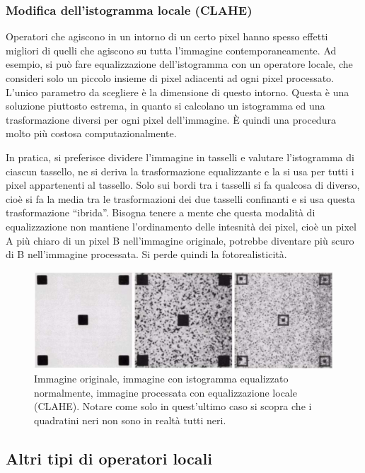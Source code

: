 \documentclass[a4paper,11pt]{article}
\begin{document}
\subsubsection{Modifica dell'istogramma locale (CLAHE)}
Operatori che agiscono in un intorno di un certo pixel hanno spesso effetti migliori di quelli che agiscono su tutta l'immagine contemporaneamente.
Ad esempio, si può fare equalizzazione dell'istogramma con un operatore locale, che consideri solo un piccolo insieme di pixel adiacenti
ad ogni pixel processato. L'unico parametro da scegliere è la dimensione di questo intorno. Questa è una soluzione piuttosto estrema, in quanto si calcolano un istogramma
ed una trasformazione diversi per ogni pixel dell'immagine. È quindi una procedura molto più costosa computazionalmente.
\par
In pratica, si preferisce dividere l'immagine in tasselli e valutare l'istogramma di ciascun tassello, ne si deriva la trasformazione equalizzante e la si usa per tutti i
pixel appartenenti al tassello. Solo sui bordi tra i tasselli si fa qualcosa di diverso, cioè si fa la media tra le trasformazioni dei due tasselli confinanti e si usa questa
trasformazione ``ibrida''.
Bisogna tenere a mente che questa modalità di equalizzazione non mantiene l'ordinamento delle intesnità dei pixel, cioè
un pixel A più chiaro di un pixel B nell'immagine originale, potrebbe diventare più scuro di B nell'immagine processata. Si perde quindi la fotorealisticità.

\renewcommand{\thefigure}{5.23}
\begin{figure}[!h]
  \centering
    \includegraphics[scale=0.4]{images/5/img_histeq_clahe.png}
    \caption{Immagine originale, immagine con istogramma equalizzato normalmente, immagine processata con equalizzazione locale (CLAHE). Notare come solo in quest'ultimo caso si scopra che i quadratini
    neri non sono in realtà tutti neri.}
\end{figure}

\subsection{Altri tipi di operatori locali}
\end{document}
